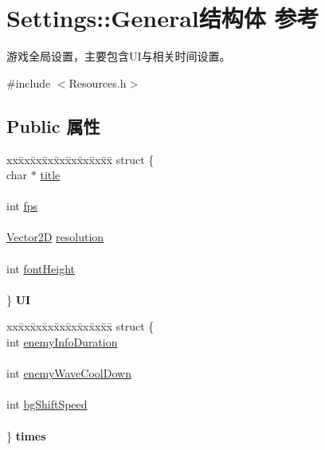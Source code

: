 \hypertarget{struct_settings_1_1_general}{}\section{Settings\+:\+:General结构体 参考}
\label{struct_settings_1_1_general}


游戏全局设置，主要包含\+U\+I与相关时间设置。  




{\ttfamily \#include $<$Resources.\+h$>$}

\subsection*{Public 属性}
\begin{DoxyCompactItemize}
\item 
\mbox{\label{struct_settings_1_1_general_a414f100b330453215b514ec726a9fac9}} 
\begin{tabbing}
xx\=xx\=xx\=xx\=xx\=xx\=xx\=xx\=xx\=\kill
struct \{\\
\>char $\ast$ \hyperlink{struct_settings_1_1_general_acb5598e7641429cde268ecd8f80c4da0}{title}\\
\>\\
\>int \hyperlink{struct_settings_1_1_general_a5ebbaffe3220c3daf7ef79c4cd7f1ad6}{fps}\\
\>\\
\>\hyperlink{structbasic__vector2_d}{Vector2D} \hyperlink{struct_settings_1_1_general_a4cdcf50e69a10db0e410db97bd547d38}{resolution}\\
\>\\
\>int \hyperlink{struct_settings_1_1_general_ad459481ace3b01e1d80a7548325d28d2}{fontHeight}\\
\>\\
\} {\bfseries UI}\\

\end{tabbing}\item 
\mbox{\label{struct_settings_1_1_general_ae31b262693f15e6ab5ea1e1c609249b9}} 
\begin{tabbing}
xx\=xx\=xx\=xx\=xx\=xx\=xx\=xx\=xx\=\kill
struct \{\\
\>int \hyperlink{struct_settings_1_1_general_a48c8c522f1359b0e60c08404ac84b481}{enemyInfoDuration}\\
\>\\
\>int \hyperlink{struct_settings_1_1_general_a309cc676568d698298f225d2755141f9}{enemyWaveCoolDown}\\
\>\\
\>int \hyperlink{struct_settings_1_1_general_ae17ce428cf02b7c52530c8752ebca9cd}{bgShiftSpeed}\\
\>\\
\} {\bfseries times}\\


\end{tabbing}
\end{DoxyCompactItemize}
